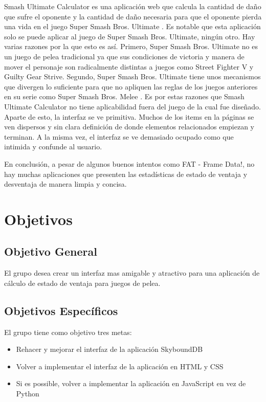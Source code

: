 Smash Ultimate Calculator es una aplicación web que calcula la cantidad de daño que sufre el oponente y la cantidad de daño necesaria para que el oponente pierda una vida en el juego Super Smash Bros. Ultimate \cite{noauthor_super_2022}. Es notable que esta aplicación solo se puede aplicar al juego de Super Smash Bros. Ultimate, ningún otro. Hay varias razones por la que esto es así. Primero, Super Smash Bros. Ultimate no es un juego de pelea tradicional ya que sus condiciones de victoria y manera de mover el personaje son radicalmente distintas a juegos como Street Fighter V y Guilty Gear Strive. Segundo, Super Smash Bros. Ultimate tiene unos mecanismos que divergen lo suficiente para que no apliquen las reglas de los juegos anteriores en su serie como Super Smash Bros. Melee \cite{noauthor_super_nodate}. Es por estas razones que Smash Ultimate Calculator no tiene aplicabilidad fuera del juego de la cual fue diseñado. Aparte de esto, la interfaz se ve primitiva. Muchos de los items en la páginas se ven dispersos y sin clara definición de donde elementos relacionados empiezan y terminan. A la misma vez, el interfaz se ve demasiado ocupado como que intimida y confunde al usuario.

En conclusión, a pesar de algunos buenos intentos como FAT - Frame Data!, no hay muchas aplicaciones que presenten las estadísticas de estado de ventaja y desventaja de manera limpia y concisa.

\section{Objetivos}

\subsection{Objetivo General} 

El grupo desea crear un interfaz mas amigable y atractivo para una aplicación de cálculo de estado de ventaja para juegos de pelea.

\subsection{Objetivos Específicos}

El grupo tiene como objetivo tres metas:
\begin{itemize}
    \item Rehacer y mejorar el interfaz de la aplicación SkyboundDB \cite{aramis_matos_aramis-matosskybounddb_2021}
    \item Volver a implementar el interfaz de la aplicación en HTML y CSS
    \item Si es possible, volver a implementar la aplicación en JavaScript en vez de Python
\end{itemize}

